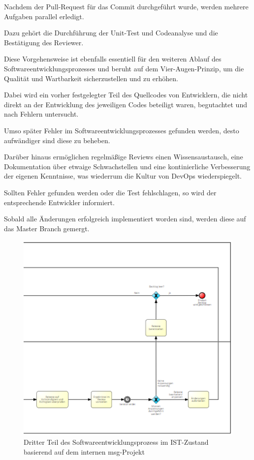 Nachdem der Pull-Request für das Commit durchgeführt wurde, werden mehrere Aufgaben parallel erledigt. 

Dazu gehört die Durchführung der Unit-Test und Codeanalyse und die Bestätigung des Reviewer.

Diese Vorgehensweise ist ebenfalls essentiell für den weiteren Ablauf des Softwareentwicklungsprozesses und beruht auf dem Vier-Augen-Prinzip, um die Qualität und Wartbarkeit sicherzustellen und zu erhöhen.  

Dabei wird ein vorher festgelegter Teil des Quellcodes von Entwicklern, die nicht direkt an der Entwicklung des jeweiligen Codes beteiligt waren, begutachtet und nach Fehlern untersucht. 

Umso später Fehler im Softwareentwicklungsprozesses gefunden werden, desto aufwändiger sind diese zu beheben. 

Darüber hinaus ermöglichen regelmäßige Reviews einen Wissensaustausch, eine Dokumentation über etwaige Schwachstellen und eine kontinierliche Verbesserung der eigenen Kenntnisse, was wiederrum die Kultur von DevOps wiederspiegelt. 

Sollten Fehler gefunden werden oder die Test fehlschlagen, so wird der entsprechende Entwickler informiert. 

Sobald alle Änderungen erfolgreich implementiert worden sind, werden diese auf das Master Branch gemergt. 

\begin{figure}[h]
    \centering
    \includegraphics[scale=0.6]{Bilder/IST-Prozess_third Part.png}
    \caption{Dritter Teil des Softwareentwicklungsprozess im IST-Zustand basierend auf dem internen msg-Projekt}
\end{figure}

